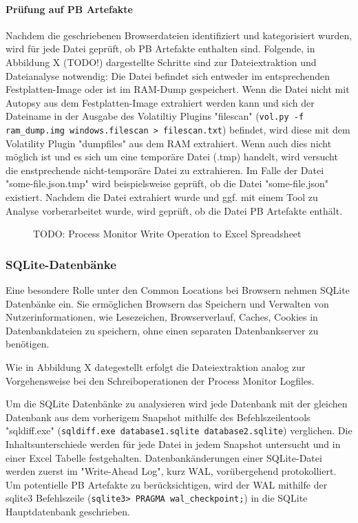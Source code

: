 \paragraph*{Prüfung auf PB Artefakte}
Nachdem die geschriebenen Browserdateien identifiziert und kategorisiert wurden, wird für jede Datei geprüft, ob PB Artefakte enthalten sind. Folgende, in Abbildung X (TODO!) dargestellte Schritte sind zur Dateiextraktion und Dateianalyse notwendig:
Die Datei befindet sich entweder im entsprechenden Festplatten-Image oder ist im RAM-Dump gespeichert. 
Wenn die Datei nicht mit Autopsy aus dem Festplatten-Image extrahiert werden kann und sich der Dateiname in der Ausgabe des Volatiltiy Plugins "filescan" (\texttt{vol.py -f ram\_dump.img windows.filescan > filescan.txt}) befindet, wird diese mit dem Volatility Plugin "dumpfiles" aus dem RAM extrahiert.
Wenn auch dies nicht möglich ist und es sich um eine temporäre Datei (.tmp) handelt, wird versucht die enstprechende nicht-temporäre Datei zu extrahieren. 
Im Falle der Datei "some-file.json.tmp" wird beispielsweise geprüft, ob die Datei "some-file.json" existiert.
Nachdem die Datei extrahiert wurde und ggf. mit einem Tool zu Analyse vorberarbeitet wurde, wird geprüft, ob die Datei PB Artefakte enthält.
\begin{figure}[h!]
	\centering
	\small
	\centerline{\resizebox{\linewidth}{!}{}}
	\caption{TODO: Process Monitor Write Operation to Excel Spreadsheet}
	\label{fig:jes}
\end{figure}

\subsubsection*{SQLite-Datenbänke}
\label{subsubsection:methodik-datenanalyse-commonlocations-sqlitedbs}
Eine besondere Rolle unter den Common Locations bei Browsern nehmen SQLite Datenbänke ein. 
Sie ermöglichen Browsern das Speichern und Verwalten von Nutzerinformationen, wie Lesezeichen, Browserverlauf, Caches, Cookies in Datenbankdateien zu speichern, ohne einen separaten Datenbankserver zu benötigen.

Wie in Abbildung X dategestellt erfolgt die Dateiextraktion analog zur Vorgehensweise bei den Schreiboperationen der Process Monitor Logfiles.

Um die SQLite Datenbänke zu analysieren wird jede Datenbank mit der gleichen Datenbank aus dem vorherigem Snapshot mithilfe des Befehlszeilentools "sqldiff.exe" (\texttt{sqldiff.exe database1.sqlite database2.sqlite}) verglichen. Die Inhaltsunterschiede werden für jede Datei in jedem Snapshot untersucht und in einer Excel Tabelle festgehalten.
Datenbankänderungen einer SQLite-Datei werden zuerst im "Write-Ahead Log", kurz WAL, vorübergehend protokolliert. 
Um potentielle PB Artefakte zu berücksichtigen, wird der WAL mithilfe der sqlite3 Befehlszeile (\texttt{sqlite3> PRAGMA wal\_checkpoint;}) in die SQLite Hauptdatenbank geschrieben.

